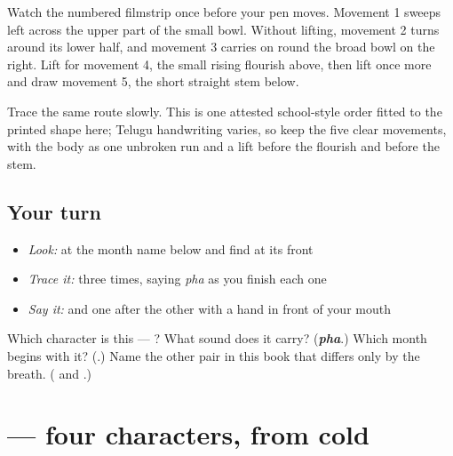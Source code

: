 Watch the numbered filmstrip once before your pen moves. Movement 1 sweeps left across the upper part of the small bowl. Without lifting, movement 2 turns around its lower half, and movement 3 carries on round the broad bowl on the right. Lift for movement 4, the small rising flourish above, then lift once more and draw movement 5, the short straight stem below.

Trace the same route slowly. This is one attested school-style order fitted to the printed shape here; Telugu handwriting varies, so keep the five clear movements, with the body as one unbroken run and a lift before the flourish and before the stem.

\subsection*{Your turn}
\begin{itemize}
\raggedright
  \item \emph{Look:} at the month name below and find  at its front
\end{itemize}

\begin{quote}
\end{quote}

\begin{itemize}
\raggedright
  \item \emph{Trace it:}  three times, saying \emph{pha} as you finish each one
  \item \emph{Say it:}  and  one after the other with a hand in front of your mouth
\end{itemize}

\begin{tcolorbox}[breakable,colback=teal!4,colframe=teal!35!black,title={Before you move on}]
Which character is this — ? What sound does it carry? (\emph{\textbf{pha}}.) Which month begins with it? (\textbf{}.) Name the other pair in this book that differs only by the breath. (\textbf{} and \textbf{}.)
\end{tcolorbox}
\section[\texorpdfstring{\te{నాలుగు} \te{అక్షరాలు} (nālugu akṣarālu)}{నాలుగు అక్షరాలు (nālugu akṣarālu)}]{  — four characters, from cold}

\label{lesson:TE-S161-script-recall-four}



